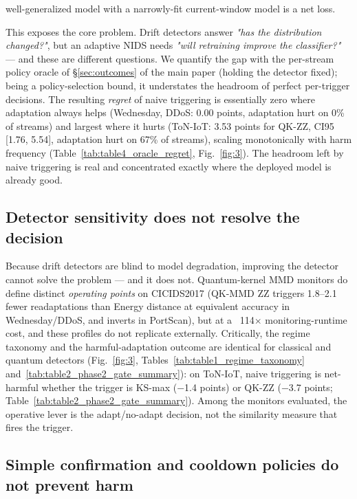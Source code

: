 \documentclass[a4paper,11pt]{article}
\makeatletter
\let\supp@subsection\subsection
\renewcommand{\subsection}{\FloatBarrier\supp@subsection}
\makeatother
\begin{document}
well-generalized model with a narrowly-fit current-window model is a net loss.


This exposes the core problem. Drift detectors answer \emph{"has the distribution changed?"}, but an adaptive NIDS needs \emph{"will retraining improve the classifier?"} --- and these are different questions. We quantify the gap with the per-stream policy oracle of \S\ref{sec:outcomes} of the main paper (holding the detector fixed); being a policy-selection bound, it understates the headroom of perfect per-trigger decisions. The resulting \emph{regret} of naive triggering is essentially zero where adaptation always helps (Wednesday, DDoS: 0.00 points, adaptation hurt on 0\% of streams) and largest where it hurts (ToN-IoT: 3.53 points for QK-ZZ, CI95 [1.76, 5.54], adaptation hurt on 67\% of streams), scaling monotonically with harm frequency (Table~\ref{tab:table4_oracle_regret}, Fig.~\ref{fig:3}). The headroom left by naive triggering is real and concentrated exactly where the deployed model is already good.


\subsection{Detector sensitivity does not resolve the decision}


Because drift detectors are blind to model degradation, improving the detector cannot solve the problem --- and it does not. Quantum-kernel MMD monitors do define distinct \emph{operating points} on CICIDS2017 (QK-MMD ZZ triggers 1.8--2.1 fewer readaptations than Energy distance at equivalent accuracy in Wednesday/DDoS, and inverts in PortScan), but at a ~114$\times$ monitoring-runtime cost, and these profiles do not replicate externally. Critically, the regime taxonomy and the harmful-adaptation outcome are identical for classical and quantum detectors (Fig.~\ref{fig:3}, Tables~\ref{tab:table1_regime_taxonomy} and~\ref{tab:table2_phase2_gate_summary}): on ToN-IoT, naive triggering is net-harmful whether the trigger is KS-max ($-$1.4 points) or QK-ZZ ($-$3.7 points; Table~\ref{tab:table2_phase2_gate_summary}). Among the monitors evaluated, the operative lever is the adapt/no-adapt decision, not the similarity measure that fires the trigger.


\subsection{Simple confirmation and cooldown policies do not prevent harm}
\end{document}
